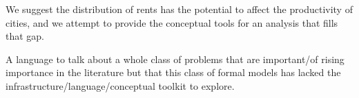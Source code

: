 We suggest the distribution of rents has the potential to affect the productivity of cities, and we attempt to provide the conceptual tools for an analysis that fills that gap.

A language to talk about a whole class of problems that are important/of rising importance in the literature but that this class of formal models has lacked the infrastructure/language/conceptual toolkit to explore.



